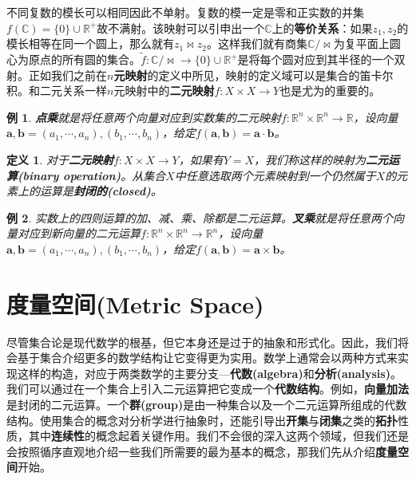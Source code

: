 \documentclass[mathserif,hyperref,UTF8,openany,b5paper]{ctexbook}
\newtheorem{exmp}{例}[section]
\newtheorem{defn}{定义}[section]
\begin{document}
不同复数的模长可以相同因此不单射。复数的模一定是零和正实数的并集$f(\mathbb{C})=\{0\}\cup  \mathbb{R}^+$故不满射。该映射可以引申出一个$\mathbb{C}$上的\textbf{等价关系}：如果$z_1,z_2$的模长相等在同一个圆上，那么就有$z_1 \bowtie z_2$。这样我们就有商集$\mathbb{C}/\bowtie$为复平面上圆心为原点的所有圆的集合。$\tilde{f}:\mathbb{C}/\bowtie \xrightarrow{} \{0\}\cup  \mathbb{R}^+$是将每个圆对应到其半径的一个双射。正如我们之前在\textbf{$n$元映射}的定义中所见，映射的定义域可以是集合的笛卡尔积。和二元关系一样$n$元映射中的\textbf{二元映射}$f: X \times X \xrightarrow{} Y$也是尤为的重要的。
\begin{exmp}
\textbf{点乘}就是将任意两个向量对应到实数集的二元映射$f: \mathbb{R}^n \times \mathbb{R}^n \xrightarrow{} \mathbb{R}$，设向量$\mathbf{a,b}=(a_1,\cdots,a_n),(b_1,\cdots,b_n)$，给定$f(\mathbf{a,b})=\mathbf{a\cdot b}$。
\end{exmp}
\begin{defn}
对于\textbf{二元映射}$f: X \times X \xrightarrow{} Y$，如果有$Y=X$，我们称这样的映射为\textbf{二元运算(binary operation)}。从集合$X$中任意选取两个元素映射到一个仍然属于$X$的元素上的运算是\textbf{封闭的(closed)}。
\end{defn}
\begin{exmp}
实数上的四则运算的加、减、乘、除都是二元运算。\textbf{叉乘}就是将任意两个向量对应到新向量的二元运算$f: \mathbb{R}^n \times \mathbb{R}^n \xrightarrow{} \mathbb{R}^n$，设向量$\mathbf{a,b}=(a_1,\cdots,a_n),(b_1,\cdots,b_n)$，给定$f(\mathbf{a,b})=\mathbf{a\times b}$。
\end{exmp}

\section{度量空间(Metric Space)}
尽管集合论是现代数学的根基，但它本身还是过于的抽象和形式化。因此，我们将会基于集合介绍更多的数学结构让它变得更为实用。数学上通常会以两种方式来实现这样的构造，对应于两类数学的主要分支—\textbf{代数(algebra)}和\textbf{分析(analysis)}。我们可以通过在一个集合上引入二元运算把它变成一个\textbf{代数结构}。例如，\textbf{向量加法}是封闭的二元运算。一个\textbf{群(group)}是由一种集合以及一个二元运算所组成的代数结构。使用集合的概念对分析学进行抽象时，还能引导出\textbf{开集}与\textbf{闭集}之类的\textbf{拓扑}性质，其中\textbf{连续性}的概念起着关键作用。我们不会很的深入这两个领域，但我们还是会按照循序直观地介绍一些我们所需要的最为基本的概念，那我们先从介绍\textbf{度量空间}开始。
\end{document}
